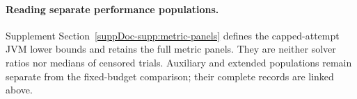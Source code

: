 \paragraph{Reading separate performance populations.}\label{ta:performance_scope_details}
Supplement Section~\ref{suppDoc-supp:metric-panels} defines the capped-attempt JVM lower bounds and retains the full metric panels. They are neither solver ratios nor medians of censored trials. Auxiliary and extended populations remain separate from the fixed-budget comparison; their complete records are linked above.

